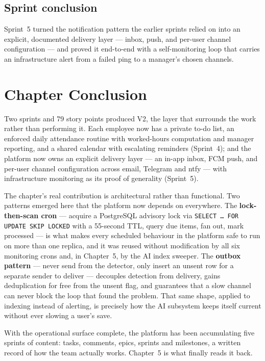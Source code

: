 \subsection{Sprint conclusion}

Sprint~5 turned the notification pattern the earlier sprints relied on into an explicit,
documented delivery layer --- inbox, push, and per-user channel configuration --- and proved it
end-to-end with a self-monitoring loop that carries an infrastructure alert from a failed ping
to a manager's chosen channels.

\section{Chapter Conclusion}

Two sprints and 79 story points produced V2, the layer that surrounds the work rather than
performing it. Each employee now has a private to-do list, an enforced daily attendance routine
with worked-hours computation and manager reporting, and a shared calendar with escalating
reminders (Sprint~4); and the platform now owns an explicit delivery layer --- an in-app inbox,
FCM push, and per-user channel configuration across email, Telegram and ntfy --- with
infrastructure monitoring as its proof of generality (Sprint~5).

The chapter's real contribution is architectural rather than functional. Two patterns emerged
here that the platform now depends on everywhere. The \textbf{lock-then-scan cron} --- acquire a
PostgreSQL advisory lock via \texttt{SELECT \ldots{} FOR UPDATE SKIP LOCKED} with a 55-second
TTL, query due items, fan out, mark processed --- is what makes every scheduled behaviour in the
platform safe to run on more than one replica, and it was reused without modification by all six
monitoring crons and, in Chapter~5, by the AI index sweeper. The \textbf{outbox pattern} ---
never send from the detector, only insert an unsent row for a separate sender to deliver ---
decouples detection from delivery, gains deduplication for free from the unsent flag, and
guarantees that a slow channel can never block the loop that found the problem. That same shape,
applied to indexing instead of alerting, is precisely how the AI subsystem keeps itself current
without ever slowing a user's save.

With the operational surface complete, the platform has been accumulating five sprints of
content: tasks, comments, epics, sprints and milestones, a written record of how the team
actually works. Chapter~5 is what finally reads it back.
